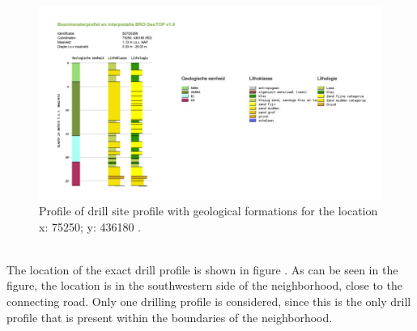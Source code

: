 \begin{figure}[htbp]
    \centering
    \includegraphics[width=0.75\linewidth]{figures/roz/rozboor.pdf}
    \caption{Profile of drill site profile with geological formations for the location x: 75250; y: 436180 \cite{tno-geologische-dienst-nederland-2023}.}
    \label{georoz}
\end{figure}\\
\noindent
The location of the exact drill profile is shown in figure . As can be seen in the figure, the location is in the southwestern side of the neighborhood, close to the connecting road. Only one drilling profile is considered, since this is the only drill profile that is present within the boundaries of the neighborhood.

